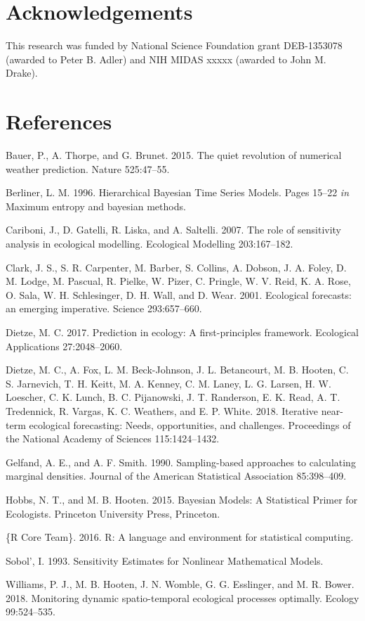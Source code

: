 \documentclass[12pt,]{article}
\begin{document}
\section{Acknowledgements}\label{acknowledgements}

This research was funded by National Science Foundation grant
DEB-1353078 (awarded to Peter B. Adler) and NIH MIDAS xxxxx (awarded to
John M. Drake).

\setlength{\parindent}{0pt}

\section{References}\label{references}

\hypertarget{refs}{}
\hypertarget{ref-Bauer2015}{}
Bauer, P., A. Thorpe, and G. Brunet. 2015. The quiet revolution of
numerical weather prediction. Nature 525:47--55.

\hypertarget{ref-Berliner1996}{}
Berliner, L. M. 1996. Hierarchical Bayesian Time Series Models. Pages
15--22 \emph{in} Maximum entropy and bayesian methods.

\hypertarget{ref-Cariboni2007}{}
Cariboni, J., D. Gatelli, R. Liska, and A. Saltelli. 2007. The role of
sensitivity analysis in ecological modelling. Ecological Modelling
203:167--182.

\hypertarget{ref-Clark2001}{}
Clark, J. S., S. R. Carpenter, M. Barber, S. Collins, A. Dobson, J. A.
Foley, D. M. Lodge, M. Pascual, R. Pielke, W. Pizer, C. Pringle, W. V.
Reid, K. A. Rose, O. Sala, W. H. Schlesinger, D. H. Wall, and D. Wear.
2001. Ecological forecasts: an emerging imperative. Science
293:657--660.

\hypertarget{ref-Dietze2017a}{}
Dietze, M. C. 2017. Prediction in ecology: A first-principles framework.
Ecological Applications 27:2048--2060.

\hypertarget{ref-Dietze2018}{}
Dietze, M. C., A. Fox, L. M. Beck-Johnson, J. L. Betancourt, M. B.
Hooten, C. S. Jarnevich, T. H. Keitt, M. A. Kenney, C. M. Laney, L. G.
Larsen, H. W. Loescher, C. K. Lunch, B. C. Pijanowski, J. T. Randerson,
E. K. Read, A. T. Tredennick, R. Vargas, K. C. Weathers, and E. P.
White. 2018. Iterative near-term ecological forecasting: Needs,
opportunities, and challenges. Proceedings of the National Academy of
Sciences 115:1424--1432.

\hypertarget{ref-Gelfand1990}{}
Gelfand, A. E., and A. F. Smith. 1990. Sampling-based approaches to
calculating marginal densities. Journal of the American Statistical
Association 85:398--409.

\hypertarget{ref-Hobbs2015}{}
Hobbs, N. T., and M. B. Hooten. 2015. Bayesian Models: A Statistical
Primer for Ecologists. Princeton University Press, Princeton.

\hypertarget{ref-R2016}{}
\{R Core Team\}. 2016. R: A language and environment for statistical
computing.

\hypertarget{ref-Sobol1993}{}
Sobol', I. 1993. Sensitivity Estimates for Nonlinear Mathematical
Models.

\hypertarget{ref-Williams2018}{}
Williams, P. J., M. B. Hooten, J. N. Womble, G. G. Esslinger, and M. R.
Bower. 2018. Monitoring dynamic spatio-temporal ecological processes
optimally. Ecology 99:524--535.
\end{document}
